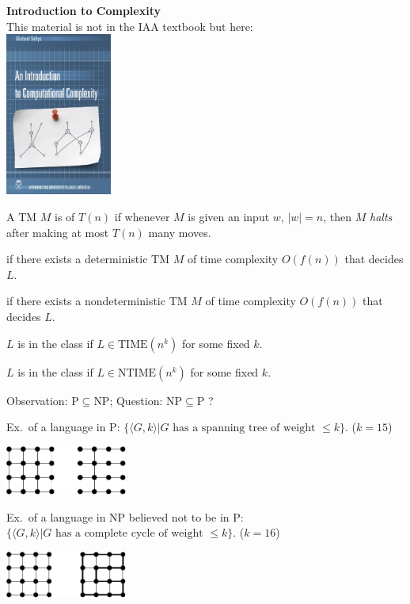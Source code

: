 \begin{frame}
\begin{center}
{\bf Introduction to Complexity} \\
This material is not in the IAA textbook but here: \\[5mm]
\includegraphics[width=3.5cm]{Figures/complexity.jpg}
\end{center}
\end{frame}

\begin{frame}
A TM $M$ is of  $T(n)$ if whenever $M$ is given
an input $w$, $|w|=n$, then $M$ {\em halts} after making at most
$T(n)$ many moves.

 if there exists a deterministic TM $M$ of
time complexity $O(f(n))$ that decides $L$.

 if there exists a nondeterministic TM
$M$ of time complexity $O(f(n))$ that decides $L$.

$L$ is in the class  if $L\in\text{TIME}(n^k)$ for some
fixed $k$.

$L$ is in the class   if $L\in\text{NTIME}(n^k)$ for some
fixed $k$.
\end{frame}

\begin{frame}
Observation: P$\subseteq$NP;  Question: NP$\subseteq$P ?

Ex.\ of a language in P:
$\{\langle G,k\rangle|\text{$G$ has a spanning tree of weight $\le k$}\}$.
($k=15$)
\begin{center}
\includegraphics[width=4cm]{Figures/13.pdf}
\end{center}

Ex.\ of a language in NP believed not to be in P:
$\{\langle G,k\rangle|\text{$G$ has a complete cycle of weight $\le k$}\}$.
($k=16$)
\begin{center}
\includegraphics[width=4cm]{Figures/12.pdf}
\end{center}
\end{frame}

